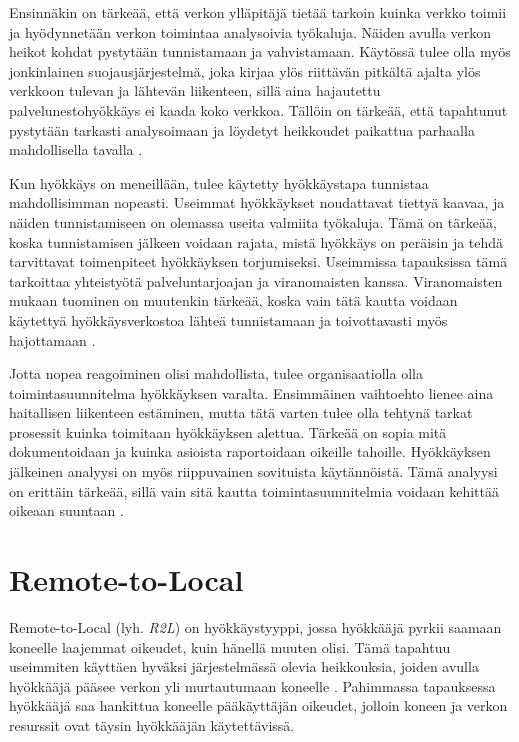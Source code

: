
Ensinnäkin on tärkeää, että verkon ylläpitäjä tietää tarkoin kuinka verkko
toimii ja hyödynnetään verkon toimintaa analysoivia työkaluja. Näiden avulla
verkon heikot kohdat pystytään tunnistamaan ja vahvistamaan. Käytössä tulee
olla myös jonkinlainen suojausjärjestelmä, joka kirjaa ylös riittävän pitkältä
ajalta ylös verkkoon tulevan ja lähtevän liikenteen, sillä aina hajautettu
palvelunestohyökkäys ei kaada koko verkkoa. Tällöin on tärkeää, että tapahtunut
pystytään tarkasti analysoimaan ja löydetyt heikkoudet paikattua parhaalla
mahdollisella tavalla \cite{DDOS}.

Kun hyökkäys on meneillään, tulee käytetty hyökkäystapa tunnistaa mahdollisimman
nopeasti. Useimmat hyökkäykset noudattavat tiettyä kaavaa, ja näiden
tunnistamiseen on olemassa useita valmiita työkaluja. Tämä on tärkeää, koska
tunnistamisen jälkeen voidaan rajata, mistä hyökkäys on peräisin ja tehdä
tarvittavat toimenpiteet hyökkäyksen torjumiseksi. Useimmissa tapauksissa
tämä tarkoittaa yhteistyötä palveluntarjoajan ja viranomaisten kanssa.
Viranomaisten mukaan tuominen on muutenkin tärkeää, koska vain tätä kautta
voidaan käytettyä hyökkäysverkostoa lähteä tunnistamaan ja toivottavasti myös
hajottamaan \cite{DDOS}.

Jotta nopea reagoiminen olisi mahdollista, tulee organisaatiolla olla
toimintasuunnitelma hyökkäyksen varalta. Ensimmäinen vaihtoehto lienee aina
haitallisen liikenteen estäminen, mutta tätä varten tulee olla tehtynä tarkat
prosessit kuinka toimitaan hyökkäyksen alettua. Tärkeää on sopia mitä
dokumentoidaan ja kuinka asioista raportoidaan oikeille tahoille. Hyökkäyksen
jälkeinen analyysi on myös riippuvainen sovituista käytännöistä. Tämä analyysi
on erittäin tärkeää, sillä vain sitä kautta toimintasuunnitelmia voidaan
kehittää oikeaan suuntaan \cite{DDOS}.


\section{Remote-to-Local}

Remote-to-Local (lyh. \textit{R2L}) on hyökkäystyyppi, jossa hyökkääjä pyrkii
saamaan koneelle laajemmat oikeudet, kuin hänellä muuten
olisi. Tämä tapahtuu useimmiten käyttäen hyväksi järjestelmässä olevia
heikkouksia, joiden avulla hyökkääjä pääsee verkon yli murtautumaan
koneelle \cite{IDS}. Pahimmassa tapauksessa hyökkääjä saa hankittua koneelle
pääkäyttäjän oikeudet, jolloin koneen ja verkon resurssit ovat täysin
hyökkääjän käytettävissä.

